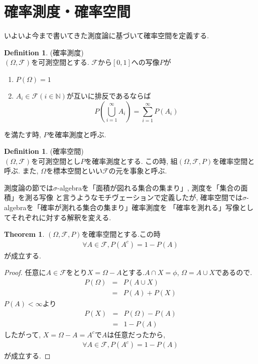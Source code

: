 \documentclass[11pt, a4paper, dvipdfmx]{jsbook}
\theoremstyle{definition}
\newtheorem{Definition+}[Axiom+]{Definition}
\newtheorem{Theorem+}[Axiom+]{Theorem}
\newcommand{\N}{\mathbb{N}}
\newcommand{\F}{\mathcal{F}}
\begin{document}
\section{確率測度・確率空間}
いよいよ今まで書いてきた測度論に基づいて確率空間を定義する. 
 \begin{Definition+}(確率測度)\\
   $(\Omega, \F)$を可測空間とする. $\F$から$[0, 1]$への写像$P$が
   \begin{enumerate}
    \item $P(\Omega) = 1$
    \item $A_{i}\in\F(i\in\N)$が互いに排反であるならば
    \begin{equation*}
      P\left(\bigcup_{i = 1}^{\infty}A_{i}\right) = \sum_{i = 1}^{\infty} P\left(A_{i}\right)
    \end{equation*}
  \end{enumerate}
  を満たす時, $P$を確率測度と呼ぶ.
 \end{Definition+}
 \begin{Definition+}(確率空間)\\
  $(\Omega, \F)$を可測空間とし$P$を確率測度とする. この時, 組$(\Omega, \F, P)$を確率空間と呼ぶ. また, $\Omega$を標本空間といい$\F$の元を事象と呼ぶ.
\end{Definition+}
測度論の節では$\sigma$-algebraを「面積が図れる集合の集まり」, 測度を「集合の面積」を測る写像
と言うようなモチヴェーションで定義したが, 確率空間では$\sigma$-algebraを「確率が測れる集合の集まり」確率測度を
「確率を測れる」写像としてそれぞれに対する解釈を変える.
\begin{Theorem+}
  $(\Omega, \F, P)$を確率空間とする.この時
    \begin{align*}
      \forall A\in\F, P(A^{c}) = 1 - P(A)
    \end{align*}
  が成立する.
  \begin{proof}
    任意に$A\in\F$をとり$X = \Omega - A$とする.$A\cap X = \phi$, $\Omega = A\cup X$であるので.
    \begin{eqnarray*}
      P(\Omega) &=& P(A\cup X)\\
                &=& P(A) + P(X)
    \end{eqnarray*}
    $P(A) < \infty$より
    \begin{eqnarray*}
      P(X) &=& P(\Omega) - P(A)\\
           &=& 1 - P(A)
    \end{eqnarray*}
    したがって, $X = \Omega - A = A^{c}$で$A$は任意だったから,
    \begin{align*}
      \forall A\in\F, P(A^{c}) = 1 - P(A)
    \end{align*}
    が成立する.
  \end{proof}
\end{Theorem+}
\end{document}
